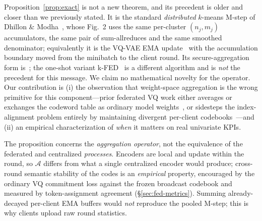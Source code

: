 \begin{remark}
Proposition~\ref{prop:exact} is not a new theorem, and its precedent is older and closer than
we previously stated. It is the standard \emph{distributed} $k$-means M-step of
Dhillon \& Modha~\cite{dhillon1999parallel}, whose Fig.~2 uses the same per-cluster
$(n_j, m_j)$ accumulators, the same pair of sum-allreduces and the same smoothed denominator;
equivalently it is the VQ-VAE EMA update~\cite[App.~A.1, Eqs.~6--8]{van_den_oord2017neural}
with the accumulation boundary moved from the minibatch to the client round. Its
secure-aggregation form is~\cite{diaa2025fastlloyd}; the one-shot
variant k-FED~\cite{dennis2021kfed} is a different algorithm and is \emph{not} the
precedent for this message. We claim no mathematical novelty for the operator.
%
Our contribution is (i) the observation that weight-space aggregation is the wrong primitive
for this component---prior federated VQ work either averages or exchanges the codeword table
as ordinary model weights~\cite{park2022fcdeepsc,jin2025svqvae}, or sidesteps the
index-alignment problem entirely by maintaining divergent per-client
codebooks~\cite{zhang2024uefl}---and (ii) an empirical characterization of \emph{when} it
matters on real univariate KPIs.
\end{remark}

\begin{remark}
The proposition concerns the \emph{aggregation operator}, not the equivalence of the
federated and centralized \emph{processes}. Encoders are local and update within the
round, so $\mathcal{A}$ differs from what a single centralized encoder would produce;
cross-round semantic stability of the codes is an \emph{empirical} property, encouraged by
the ordinary VQ commitment loss against the frozen broadcast codebook and measured by
token-assignment agreement (\S\ref{sec:fed-metrics}). Summing already-decayed per-client
EMA buffers would \emph{not} reproduce the pooled M-step; this is why clients upload raw
round statistics.
\end{remark}

